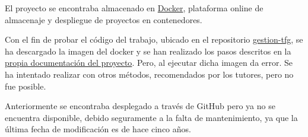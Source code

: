 El proyecto se encontraba almacenado en \href{https://www.docker.com/}{Docker}, plataforma online de almacenaje y despliegue  de proyectos en contenedores. 

Con el fin de probar el código del trabajo, ubicado en el repositorio \href{https://github.com/gabriel-stan/gestion-tfg}{gestion-tfg}, se ha descargado la imagen del docker y se han realizado los pasos descritos en la \href{https://github.com/gabriel-stan/gestion-tfg/blob/master/docs/README-contenerizacion.md}{propia documentación del proyecto}. Pero, al ejecutar dicha imagen da error. Se ha intentado realizar con otros métodos, recomendados por los tutores, pero no fue posible.

Anteriormente se encontraba desplegado a través de GitHub pero ya no se encuentra disponible, debido seguramente a la falta de mantenimiento, ya que la última fecha de modificación es de hace cinco años. 


                                                                                                                                





